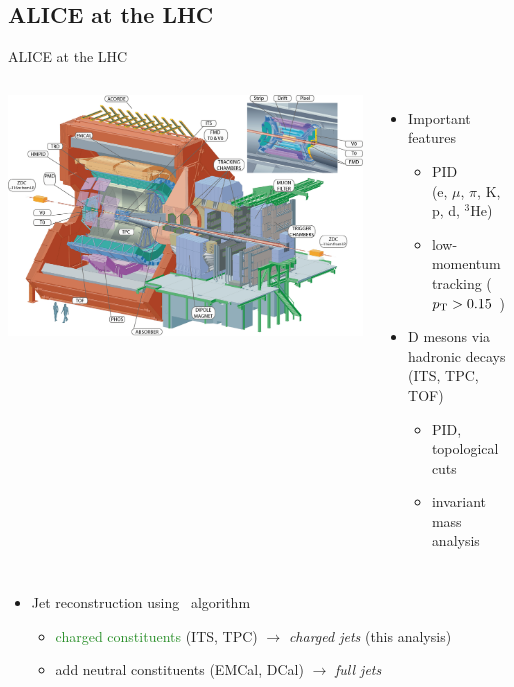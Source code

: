 \documentclass[xcolor={usenames,dvipsnames}]{beamer}
\begin{document}
\subsection{ALICE at the LHC}
\begin{frame}{ALICE at the LHC}
\begin{columns}

\includegraphics[width=\textwidth]{img/ALICE_Schematics}

\begin{itemize}
\item Important features
\begin{itemize}
\item \alert{PID} \\
(e, $\mu$, $\pi$, K, p, d, ${}^3$He)
\item \alert{low-momentum tracking} ($p_{\rm T} > 0.15$~\GeVc)
\end{itemize}
\item \alert{D mesons} via hadronic decays (ITS, TPC, TOF)
\begin{itemize}
\item PID, topological cuts
\item invariant mass analysis
\end{itemize}
\end{itemize}
\end{columns}
\begin{itemize}
\item \alert{Jet reconstruction} using \antikt\ algorithm
\begin{itemize}
\item \textcolor{ForestGreen}{charged constituents} (ITS, TPC) $\rightarrow$ \emph{charged jets} (this analysis)
\item add \textcolor{NavyBlue}{neutral constituents} (EMCal, DCal) $\rightarrow$ \emph{full jets} 
\end{itemize}
\end{itemize}
\end{frame}
\end{document}
